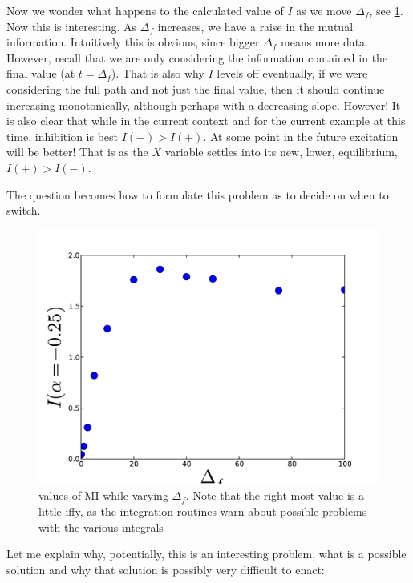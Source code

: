 \documentclass{article}
\begin{document}
Now we wonder what happens to the calculated value of $I$ as we move $\Delta_f$,
see \cref{fig:MI_delta_f_variation}. Now this is interesting. As $\Delta_f$
increases, we have a raise in the mutual information. Intuitively this is
obvious, since bigger $\Delta_f$ means more data. However, recall that we are
only considering the information contained in the final value (at $t=\Delta_f$).
That is also why $I$ levels off eventually, if we were considering the full path
and not just the final value, then it should continue increasing monotonically,
although perhaps with a decreasing slope. However! It is also clear that while
in the current context and for the current example at this time, inhibition is
best $I(-) > I(+)$. At some point in the future excitation will be better! That
is as the $X$ variable settles into its new, lower, equilibrium, $I(+) > I(-)$.

The question becomes how to formulate this problem as to decide on when to
switch. 
\begin{figure}[htp]
\begin{center}
  \includegraphics[width=1\textwidth]{Figs/MI/forward_deltas_vs_MIs.pdf}
\caption{values of MI while varying $\Delta_f$. Note that the right-most value
is a little iffy, as the integration routines warn about possible problems with
the various integrals}
	\label{fig:MI_delta_f_variation}
\end{center}
\end{figure} 
Let me explain why, potentially, this is an interesting problem, what is a
possible solution and why that solution is possibly very difficult to enact:
\end{document}
